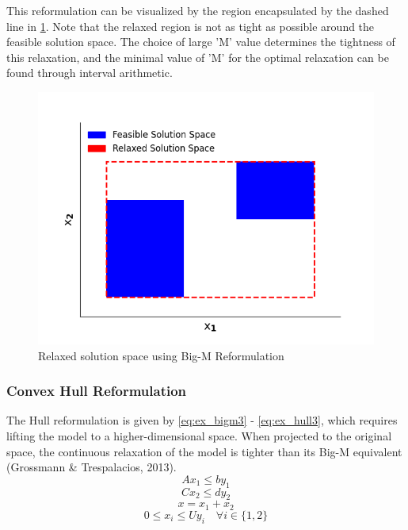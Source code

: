 \documentclass{juliacon}
\begin{document}
This reformulation can be visualized by the region encapsulated by the dashed line in \ref{fig:bigm}. Note that the relaxed region is not as tight as possible around the feasible solution space. The choice of large 'M' value determines the tightness of this relaxation, and the minimal value of 'M' for the optimal relaxation can be found through interval arithmetic.
\begin{figure}[h]
    \centering
    \includegraphics[scale=0.5]{bigm.png}
    \caption{Relaxed solution space using Big-M Reformulation}
    \label{fig:bigm}
\end{figure}
\vskip 6pt

\subsubsection{Convex Hull Reformulation}
The Hull reformulation is given by \eqref{eq:ex_bigm3} - \eqref{eq:ex_hull3}, which requires lifting the model to a higher-dimensional space. When projected to the original space, the continuous relaxation of the model is tighter than its Big-M equivalent (Grossmann \& Trespalacios, 2013).
\vskip 6pt
\begin{equation}
    \label{eq:ex_hull1}
    Ax_1 \leq by_1
\end{equation}
\begin{equation}
    \label{eq:ex_hull0}
    Cx_2 \leq dy_2
\end{equation}
\begin{equation}
    \label{eq:ex_hull2}
    x = x_1 + x_2
\end{equation}
\begin{equation}
    \label{eq:ex_hull3}
    0 \leq x_i \leq U y_i \quad \forall i \in \{1,2\}
\end{equation}
\vskip 6pt
\end{document}
